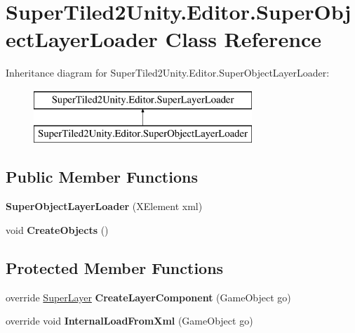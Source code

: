 \hypertarget{class_super_tiled2_unity_1_1_editor_1_1_super_object_layer_loader}{}\section{Super\+Tiled2\+Unity.\+Editor.\+Super\+Object\+Layer\+Loader Class Reference}
\label{class_super_tiled2_unity_1_1_editor_1_1_super_object_layer_loader}
Inheritance diagram for Super\+Tiled2\+Unity.\+Editor.\+Super\+Object\+Layer\+Loader\+:\begin{figure}[H]
\begin{center}
\leavevmode
\includegraphics[height=2.000000cm]{class_super_tiled2_unity_1_1_editor_1_1_super_object_layer_loader}
\end{center}
\end{figure}
\subsection*{Public Member Functions}
\begin{DoxyCompactItemize}
\item 
\mbox{\label{class_super_tiled2_unity_1_1_editor_1_1_super_object_layer_loader_a122d89a1c5899c311271a710ae993a13}} 
{\bfseries Super\+Object\+Layer\+Loader} (X\+Element xml)
\item 
\mbox{\label{class_super_tiled2_unity_1_1_editor_1_1_super_object_layer_loader_a116d7d77ad2e89a8cfad2b4096feddcb}} 
void {\bfseries Create\+Objects} ()
\end{DoxyCompactItemize}
\subsection*{Protected Member Functions}
\begin{DoxyCompactItemize}
\item 
\mbox{\label{class_super_tiled2_unity_1_1_editor_1_1_super_object_layer_loader_a5c41d6edeefebea5b5ec5a2a237e7647}} 
override \mbox{\hyperlink{class_super_tiled2_unity_1_1_super_layer}{Super\+Layer}} {\bfseries Create\+Layer\+Component} (Game\+Object go)
\item 
\mbox{\label{class_super_tiled2_unity_1_1_editor_1_1_super_object_layer_loader_af853453b487ae02dcbb2fd900f9c00d9}} 
override void {\bfseries Internal\+Load\+From\+Xml} (Game\+Object go)
\end{DoxyCompactItemize}
